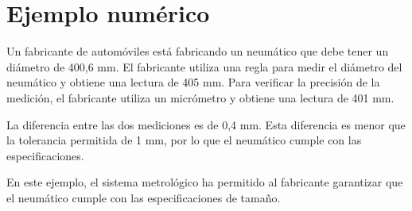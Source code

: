 \documentclass{article}
\theoremstyle{mytheoremstyle}
\theoremstyle{mytheoremstyle}
\theoremstyle{myproblemstyle}
\begin{document}
\section{Ejemplo numérico}


Un fabricante de automóviles está fabricando un neumático que debe tener un diámetro de 400,6 mm. El fabricante utiliza una regla para medir el diámetro del neumático y obtiene una lectura de 405 mm. Para verificar la precisión de la medición, el fabricante utiliza un micrómetro y obtiene una lectura de 401 mm.

La diferencia entre las dos mediciones es de 0,4 mm. Esta diferencia es menor que la tolerancia permitida de 1 mm, por lo que el neumático cumple con las especificaciones.

En este ejemplo, el sistema metrológico ha permitido al fabricante garantizar que el neumático cumple con las especificaciones de tamaño.

\nocite{*}

\end{document}
